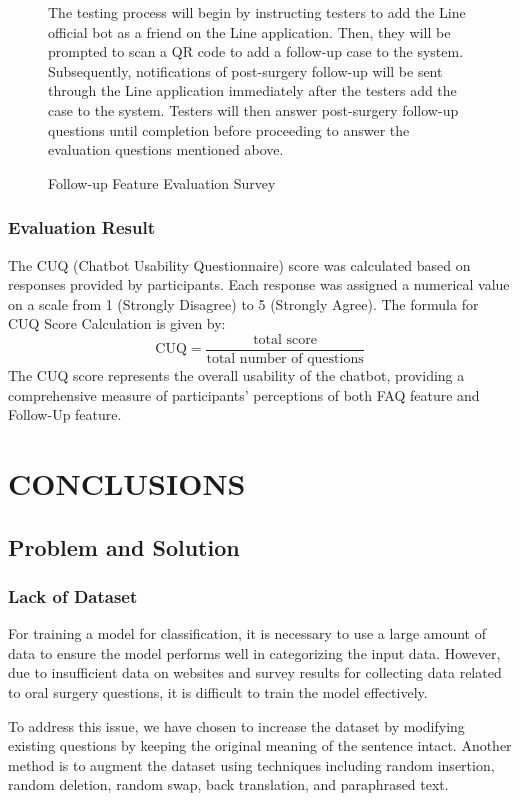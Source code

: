 \documentclass[12pt,oneside,openright,a4paper]{cpe-english-project}
\begin{document}
\begin{figure}[H]
\begin{minipage}{0.3\textwidth}
          \end{minipage}
          \caption{Follow-up Feature Evaluation Survey}\label{fig:followupform}
            \begin{justify}
              \qquad The testing process will begin by instructing testers to add the Line official bot as a friend on the Line application. Then, they will be prompted to scan a QR code to add a follow-up case to the system. Subsequently, notifications of post-surgery follow-up will be sent through the Line application immediately after the testers add the case to the system. Testers will then answer post-surgery follow-up questions until completion before proceeding to answer the evaluation questions mentioned above.\par            
            \end{justify}
        \end{figure}
      \subsection{Evaluation Result}
        \qquad The CUQ (Chatbot Usability Questionnaire) score was calculated based on responses provided by participants. Each response was assigned a numerical value on a scale from 1 (Strongly Disagree) to 5 (Strongly Agree). The formula for CUQ Score Calculation is given by:
        \[
        \text{CUQ} = \frac{\text{total score}}{\text{total number of questions}}
        \]
        \qquad The CUQ score represents the overall usability of the chatbot, providing a comprehensive measure of participants' perceptions of both FAQ feature and Follow-Up feature.\par
    
    \chapter{CONCLUSIONS}
      \section{Problem and Solution}
        \subsection{Lack of Dataset}
          \qquad For training a model for classification, it is necessary to use a large amount of data to ensure the model performs well in categorizing the input data. However, due to insufficient data on websites and survey results for collecting data related to oral surgery questions, it is difficult to train the model effectively. \par
          \qquad To address this issue, we have chosen to increase the dataset by modifying existing questions by keeping the original meaning of the sentence intact. Another method is to augment the dataset using techniques including random insertion, random deletion, random swap, back translation, and paraphrased text. \par
\end{document}
